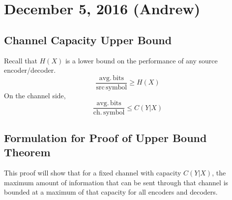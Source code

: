 \documentclass[11pt]{article}
\theoremstyle{definition}
\begin{document}
\newpage
\section{December 5, 2016 (Andrew)}

\subsection{Channel Capacity Upper Bound}

Recall that $H(X)$ is a lower bound on the performance of any source encoder/decoder. 
$$\frac{\mathrm{avg. \, bits}}{\mathrm{src \, symbol}} \geq H(X)$$
On the channel side, 
$$\frac{\mathrm{avg. \, bits}}{\mathrm{ch. \, symbol}} \leq C(Y|X)$$

\subsection{Formulation for Proof of Upper Bound Theorem}
This proof will show that for a fixed channel with capacity $C(Y|X)$, the maximum amount of information that can be sent through that channel is bounded at a maximum of that capacity for all encoders and decoders.
\end{document}
